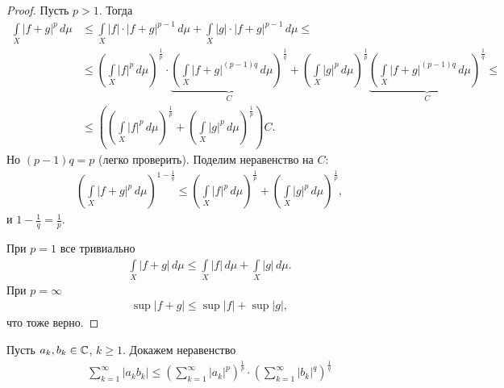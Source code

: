 \begin{proof}
 Пусть $p > 1$. Тогда
 \begin{align*}
  \int\limits_{X} \left| f+g \right|^{p} \, d\mu  &\leqslant \int\limits_{X} \left| f \right| \cdot \left| f + g \right|^{p - 1} \, d\mu  + \int\limits_{X} \left| g \right| \cdot \left| f+g \right|^{p-1} \, d\mu  \leqslant \\
  &\leqslant \left( \int\limits_{X} \left| f \right|^{p} \, d\mu   \right)^{\frac{1}{p}} \cdot \underbrace{\left( \int\limits_{X} \left| f+g \right|^{(p-1)q} \, d\mu   \right)^{\frac{1}{q}}}_{C} + \left( \int\limits_{X} \left| g \right|^{p} \, d\mu \right)^{\frac{1}{p}}\underbrace{\left( \int\limits_{X} \left| f+g \right|^{(p-1)q} \, d\mu   \right)^{\frac{1}{q}}}_{C} \leqslant \\
  &\leqslant \left( \left( \int\limits_{X} \left| f \right|^{p} \, d\mu   \right)^{\frac{1}{p}} + \left( \int\limits_{X} \left| g \right|^{p} \, d\mu   \right)^{\frac{1}{p}} \right)C
 .\end{align*} Но $(p-1)q = p$ (легко проверить). Поделим неравенство на  $C$: \begin{align*}
  \left( \int\limits_{X} \left| f+g \right|^{p} \, d\mu   \right)^{1 - \frac{1}{q}} \leqslant \left( \int\limits_{X} \left| f \right|^{p} \, d\mu   \right)^{\frac{1}{p}} + \left( \int\limits_{X} \left| g \right|^{p} \, d\mu   \right)^{\frac{1}{p}}
 ,\end{align*} и $1 - \frac{1}{q} = \frac{1}{p}$.

 При $p = 1$ все тривиально  \begin{align*}
  \int\limits_{X} \left| f + g \right| \, d\mu   \leqslant \int\limits_{X} \left| f \right| \, d\mu  + \int\limits_{X} \left| g \right| \, d\mu  
 .\end{align*}  При $p=\infty$ \begin{align*}
  \sup \left| f+g \right| \leqslant \sup \left| f \right| + \sup \left| g \right|
 ,\end{align*} что тоже верно.
\end{proof}
\begin{exmpl}
 Пусть $a_k, b_k \in \mathbb{C}$, $k \geqslant 1$. Докажем неравенство \begin{align*}
  \sum_{k=1}^{\infty} \left| a_{k} b_k \right| \leqslant \left( \sum_{k=1}^{\infty} \left| a_k \right|^{p} \right)^{\frac{1}{p}} \cdot \left( \sum_{k=1}^{\infty} \left| b_k \right|^{q} \right)^{\frac{1}{q}}
 \end{align*} 
\end{exmpl}
